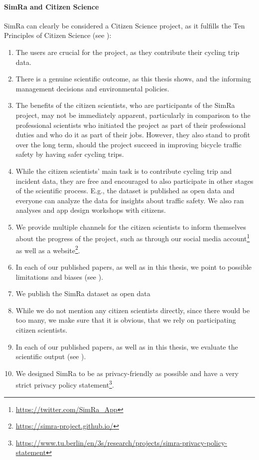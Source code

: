 \paragraph{SimRa and Citizen Science}
SimRa can clearly be considered a Citizen Science project, as it fulfills the Ten Principles of Citizen Science (see ):
\begin{enumerate}
\item The users are crucial for the project, as they contribute their cycling trip data.
\item There is a genuine scientific outcome, as this thesis shows, and the informing management decisions and environmental policies.
\item The benefits of the citizen scientists, who are participants of the SimRa project, may not be immediately apparent, particularly in comparison to the professional scientists who initiated the project as part of their professional duties and who do it as part of their jobs.
However, they also stand to profit over the long term, should the project succeed in improving bicycle traffic safety by having safer cycling trips.
\item While the citizen scientists' main task is to contribute cycling trip and incident data, they are free and encouraged to also participate in other stages of the scientific process.
E.g., the dataset is published as open data and everyone can analyze the data for insights about traffic safety.
We also ran analyses and app design workshops with citizens.
\item We provide multiple channels for the citizen scientists to inform themselves about the progress of the project, such as through our social media account\footnote{\url{https://twitter.com/SimRa_App}} as well as a website\footnote{\url{https://simra-project.github.io/}}.
\item In each of our published papers, as well as in this thesis, we point to possible limitations and biases (see ).
\item We publish the SimRa dataset as open data~\cite{dataset_simra_set1,dataset_simra_set2,dataset_simra_set3}
\item While we do not mention any citizen scientists directly, since there would be too many, we make sure that it is obvious, that we rely on participating citizen scientists.
\item In each of our published papers, as well as in this thesis, we evaluate the scientific output (see ).
\item We designed SimRa to be as privacy-friendly as possible and have a very strict privacy policy statement\footnote{\url{https://www.tu.berlin/en/3s/research/projects/simra-privacy-policy-statement}}.
\end{enumerate}

